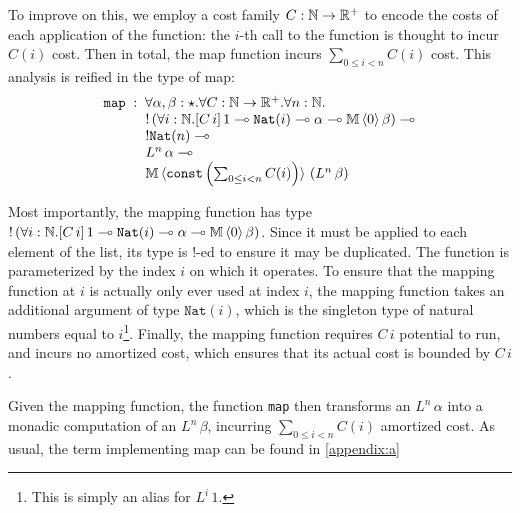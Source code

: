To improve on this, we employ a cost family $C : \mathbb{N} \to \mathbb{R}^+$ to encode the costs of each application of the function: the $i$-th call to the function is thought to incur $C(i)$ cost. Then in total, the map function incurs $\sum_{0 \leq i < n} C(i)$ cost. This analysis is reified in the type of map:
$$
\begin{array}{l}
\texttt{map} \; : \; \forall \alpha,\beta : \star. \forall C : \mathbb{N} \to \mathbb{R}^+. \forall n : \mathbb{N}. \\
\hspace{3em} !\left(\forall i : \mathbb{N}. [C \, i] \, 1 \multimap \texttt{Nat}(i) \multimap \alpha \multimap \mathbb{M} \, \langle 0 \rangle\,  \beta\right) \multimap\\
\hspace{3em}  !\texttt{Nat}(n) \multimap \\
\hspace{3em}  L^n \,\alpha \multimap\\ 
\hspace{3em}  \mathbb{M} \, \langle \texttt{const}\left(\sum_{0 \leq i < n} C(i)\right) \rangle\, \left(L^n \, \beta\right)
\end{array}
$$

Most importantly, the mapping function has type $!\left(\forall i : \mathbb{N}. [C \, i] \, 1 \multimap \texttt{Nat}(i) \multimap \alpha \multimap \mathbb{M} \, \langle 0 \rangle\,  \beta\right)$. Since it must be applied to each element of the list, its type is $!$-ed to ensure it may be duplicated. The function is parameterized by the index $i$ on which it operates. To ensure that the mapping function at $i$ is actually only ever used at index $i$, the mapping function takes an additional argument of type $\texttt{Nat}(i)$, which is the singleton type of natural numbers equal to $i$\footnote{
This is simply an alias for $L^i \, 1$.
}. Finally, the mapping function requires $C \, i$ potential to run, and incurs no amortized cost, which ensures that its actual cost is bounded by $C \, i$.

Given the mapping function, the function \texttt{map} then transforms an $L^n \, \alpha$ into a monadic computation of an $L^n \, \beta$, incurring $\sum_{0 \leq i < n} C(i)$ amortized cost. As usual, the term implementing map can be found in \autoref{appendix:a}



